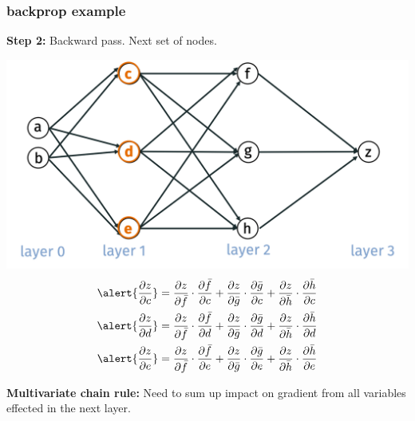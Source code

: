 \documentclass[handout,compress]{beamer}
\begin{document}
	\begin{frame}[t]
	\frametitle{backprop example}
	\small
	\textbf{Step 2:} Backward pass. Next set of nodes.
	
	\includegraphics[width=.5\textwidth]{nodes2.png}
	\begin{align*}
	\alert{\frac{\partial z}{\partial c}} &= \frac{\partial z}{\partial \bar{f}}\cdot \frac{\partial \bar{f}}{\partial c} + \frac{\partial z}{\partial \bar{g}}\cdot \frac{\partial \bar{g}}{\partial c} + \frac{\partial z}{\partial \bar{h}}\cdot \frac{\partial \bar{h}}{\partial c}\\
	\alert{\frac{\partial z}{\partial d}} &= \frac{\partial z}{\partial \bar{f}}\cdot \frac{\partial \bar{f}}{\partial d} + \frac{\partial z}{\partial \bar{g}}\cdot \frac{\partial \bar{g}}{\partial d} + \frac{\partial z}{\partial \bar{h}}\cdot \frac{\partial \bar{h}}{\partial d}\\
	\alert{\frac{\partial z}{\partial e}} &= \frac{\partial z}{\partial \bar{f}}\cdot \frac{\partial \bar{f}}{\partial e} + \frac{\partial z}{\partial \bar{g}}\cdot \frac{\partial \bar{g}}{\partial e} + \frac{\partial z}{\partial \bar{h}}\cdot \frac{\partial \bar{h}}{\partial e}
	\end{align*}
	\vspace{-1em}
	
	\begin{center}
		\textbf{Multivariate chain rule:} Need to sum up impact on gradient from all variables effected in the next layer.
	\end{center}
\end{frame}
\end{document}
